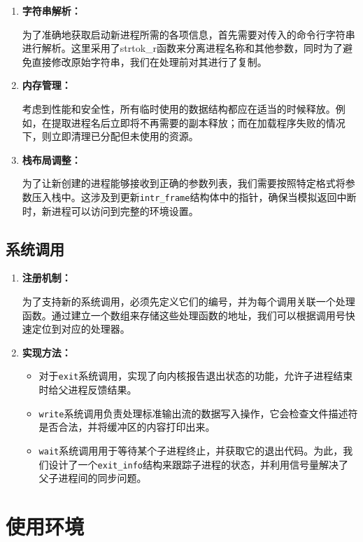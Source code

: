 \documentclass{article}
\begin{document}
\begin{enumerate}
	\item 
	\textbf{字符串解析：}
	
	为了准确地获取启动新进程所需的各项信息，首先需要对传入的命令行字符串进行解析。这里采用了strtok\_r函数来分离进程名称和其他参数，同时为了避免直接修改原始字符串，我们在处理前对其进行了复制。
	
	\item 
	\textbf{内存管理：}
	
	考虑到性能和安全性，所有临时使用的数据结构都应在适当的时候释放。例如，在提取进程名后立即将不再需要的副本释放；而在加载程序失败的情况下，则立即清理已分配但未使用的资源。
	
	\item
	\textbf{栈布局调整：}
	
	为了让新创建的进程能够接收到正确的参数列表，我们需要按照特定格式将参数压入栈中。这涉及到更新\texttt{intr\_frame}结构体中的指针，确保当模拟返回中断时，新进程可以访问到完整的环境设置。
\end{enumerate}

\subsection{系统调用}

\begin{enumerate}
	\item 
	\textbf{注册机制：}
	
	为了支持新的系统调用，必须先定义它们的编号，并为每个调用关联一个处理函数。通过建立一个数组来存储这些处理函数的地址，我们可以根据调用号快速定位到对应的处理器。
	
	\item 
	\textbf{实现方法：}
	
	\begin{itemize}
		\item 对于\texttt{exit}系统调用，实现了向内核报告退出状态的功能，允许子进程结束时给父进程反馈结果。
		\item \texttt{write}系统调用负责处理标准输出流的数据写入操作，它会检查文件描述符是否合法，并将缓冲区的内容打印出来。
		\item \texttt{wait}系统调用用于等待某个子进程终止，并获取它的退出代码。为此，我们设计了一个\texttt{exit\_info}结构来跟踪子进程的状态，并利用信号量解决了父子进程间的同步问题。
	\end{itemize}
\end{enumerate}

\section{使用环境}
\end{document}
